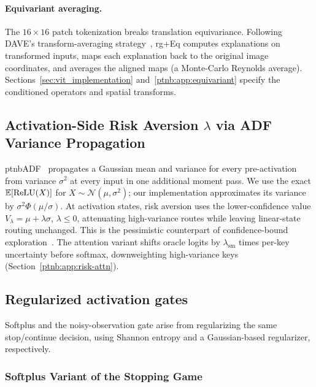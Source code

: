 \paragraph{Equivariant averaging.}\label{subsec:technicalities}
The $16\times16$ patch tokenization breaks translation equivariance. Following DAVE's transform-averaging strategy~\parencite{Wrobel2024}, \ac{rg}+Eq computes explanations on transformed inputs, maps each explanation back to the original image coordinates, and averages the aligned maps (a Monte-Carlo Reynolds average). Sections~\ref{sec:vit_implementation} and~\ref{ptnb:app:equivariant} specify the conditioned operators and spatial transforms.

\subsection{Activation-Side Risk Aversion \texorpdfstring{$\lambda$}{lambda} via ADF Variance Propagation}\label{ptnb:app:adf-variance}

\Ac{ptnbADF}~\parencite{gast2018lightweight} propagates a Gaussian mean and variance for every pre-activation from variance $\sigma^2$ at every input in one additional moment pass. We use the exact
$\mathbb{E}[\text{ReLU}(X)]$ for $X\sim\mathcal N(\mu,\sigma^2)$; our implementation approximates its variance
by $\sigma^2\Phi(\mu/\sigma)$. At activation states, risk aversion uses the lower-confidence value
$V_\lambda=\mu+\lambda\sigma$, $\lambda\le0$, attenuating high-variance routes while leaving
linear-state routing unchanged. This is the pessimistic counterpart of confidence-bound
exploration~\parencite{auer2002finite,zhang2021risk}. The attention variant shifts oracle logits by
$\lambda_{\mathrm{sm}}$ times per-key uncertainty before softmax, downweighting high-variance keys
(Section~\ref{ptnb:app:risk-attn}).

\subsection{Regularized activation gates}\label{ptnb:app:regularized-gates}

Softplus and the noisy-observation gate arise from regularizing the same stop/continue decision, using Shannon entropy and a Gaussian-based regularizer, respectively.

\subsubsection{Softplus Variant of the Stopping Game}\label{ptnb:app:softplus-stopping-game}

